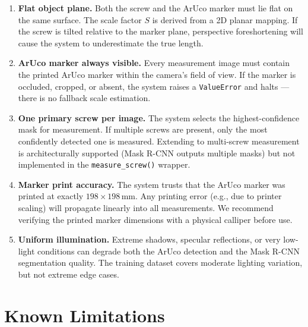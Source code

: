 \documentclass[12pt, a4paper, twoside]{report}
\begin{document}
\begin{enumerate}
    \item \textbf{Flat object plane.} Both the screw and the ArUco marker must lie flat on the same surface. The scale factor $S$ is derived from a 2D planar mapping. If the screw is tilted relative to the marker plane, perspective foreshortening will cause the system to underestimate the true length.

    \item \textbf{ArUco marker always visible.} Every measurement image must contain the printed ArUco marker within the camera's field of view. If the marker is occluded, cropped, or absent, the system raises a \texttt{ValueError} and halts --- there is no fallback scale estimation.

    \item \textbf{One primary screw per image.} The system selects the highest-confidence mask for measurement. If multiple screws are present, only the most confidently detected one is measured. Extending to multi-screw measurement is architecturally supported (Mask R-CNN outputs multiple masks) but not implemented in the \texttt{measure\_screw()} wrapper.

    \item \textbf{Marker print accuracy.} The system trusts that the ArUco marker was printed at exactly $198 \times 198$\,mm. Any printing error (e.g., due to printer scaling) will propagate linearly into all measurements. We recommend verifying the printed marker dimensions with a physical calliper before use.

    \item \textbf{Uniform illumination.} Extreme shadows, specular reflections, or very low-light conditions can degrade both the ArUco detection and the Mask R-CNN segmentation quality. The training dataset covers moderate lighting variation, but not extreme edge cases.
\end{enumerate}

\section{Known Limitations}
\end{document}
